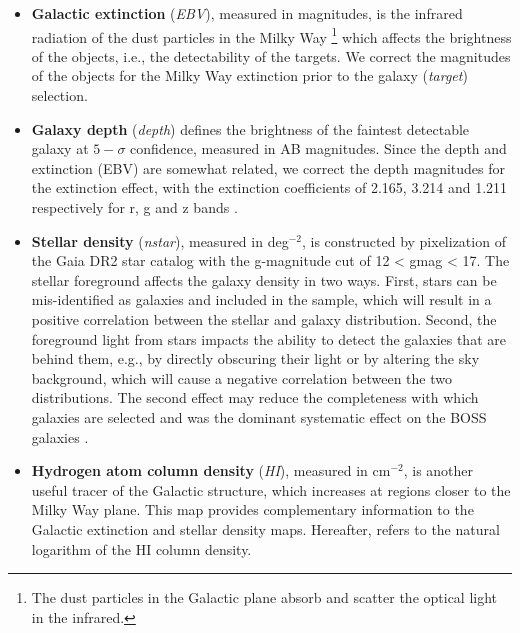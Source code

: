 \documentclass[fleqn, usenatbib]{mnras}
\newcommand{\lnHI}{$lnHI$}
\begin{document}
\begin{itemize}
    \item \textbf{Galactic extinction} (\textit{EBV}), measured in magnitudes, is the infrared radiation of the dust particles in the Milky Way \footnote{The dust particles in the Galactic plane absorb and scatter the optical light in the infrared.} which affects the brightness of the objects, i.e., the detectability of the targets. We correct the magnitudes of the objects for the Milky Way extinction prior to the galaxy (\textit{target}) selection.\\
    
    \item \textbf{Galaxy depth} (\textit{depth}) defines the brightness of the faintest detectable galaxy at $5-\sigma$ confidence, measured in AB magnitudes. Since the depth and extinction (EBV) are somewhat related, we correct the depth magnitudes for the extinction effect, with the extinction coefficients of 2.165, 3.214 and 1.211 respectively for r, g and z bands \citep{schlafly2011measuring}.\\
    
    \item {\bf Stellar density} (\textit{nstar}), measured in deg$^{-2}$, is constructed by pixelization of the Gaia DR2 star catalog \citep{brown2018gaia} with the g-magnitude cut of 12 < gmag < 17. The stellar foreground affects the galaxy density in two ways. First, stars can be mis-identified as galaxies and included in the sample, which will result in a positive correlation between the stellar and galaxy distribution. Second, the foreground light from stars impacts the ability to detect the galaxies that are behind them, e.g., by directly obscuring their light or by altering the sky background, which will cause a negative correlation between the two distributions. The second effect may reduce the completeness with which galaxies are selected and was the dominant systematic effect on the BOSS galaxies \citep{ashley2012MNRAS}. \\
    
    \item \textbf{Hydrogen atom column density} (\textit{HI}), measured in cm$^{-2}$, is another useful tracer of the Galactic structure, which increases at regions closer to the Milky Way plane. This map provides complementary information to the Galactic extinction and stellar density maps. Hereafter, \text{\lnHI} refers to the natural logarithm of the HI column density.\\


\end{itemize}
\end{document}
